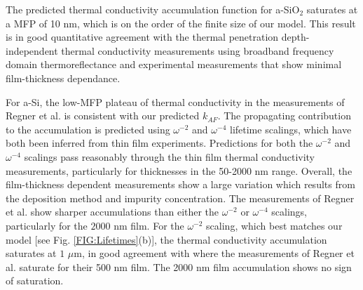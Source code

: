 \documentclass[aps,prb,twocolumn,superscriptaddress,footinbib,amsmath,amssymb,floatfix]{revtex4}
\begin{document}
The predicted thermal conductivity accumulation function for a-SiO$_2$ 
saturates at a MFP of 10 nm, which is on the order of the finite size 
of our model. This result is in good quantitative agreement 
with the thermal penetration depth-independent thermal 
conductivity measurements using broadband frequency domain 
thermoreflectance\cite{regner_broadband_2013} and experimental 
measurements that show minimal film-thickness dependance.
\cite{lee_heat_1997,yamane_measurement_2002} 

For a-Si, the low-MFP plateau of thermal conductivity in the   
measurements of Regner et al. is consistent with our 
predicted $k_{AF}$. 
The propagating contribution to the accumulation is predicted 
using $\omega^{-2}$ and $\omega^{-4}$ lifetime scalings, which 
have both been inferred from thin film experiments.
\cite{feldman_thermal_1993,cahill_thermal_1994,
feldman_numerical_1999,zink_thermal_2006,zink_excess_2006,
liu_high_2009,yang_anomalously_2010} 
Predictions for both the $\omega^{-2}$ and $\omega^{-4}$ scalings 
pass reasonably through the thin film thermal conductivity 
measurements, particularly for thicknesses in the 50-2000 nm range. 
Overall, the film-thickness dependent measurements show a large 
variation which results from the deposition method and impurity 
concentration.
\cite{vacher_attenuation_1980,liu_high_2009,yang_anomalously_2010,
li_effect_2011} 
The measurements of Regner et al. show sharper accumulations 
than either the $\omega^{-2}$ or $\omega^{-4}$ scalings, 
particularly for the $2000$ nm film. 
For the $\omega^{-2}$ scaling, which best matches our model 
[see Fig. \ref{FIG:Lifetimes}(b)], 
the thermal conductivity accumulation 
saturates at $1$ $\mu$m, in good agreement with where the measurements 
of Regner et al. saturate for their 500 nm film. The 2000 nm 
film accumulation shows no sign of saturation. 


\end{document}

